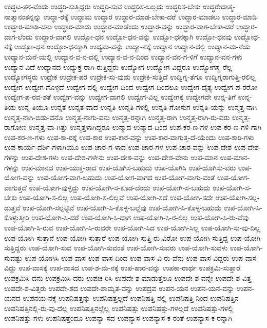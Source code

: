{ಉದ್ಧಟ-ತನ-ವೆಂದು
ಉದ್ಧರಿ-ಸುತ್ತಿದ್ದರು
ಉದ್ಧರಿ-ಸುವ
ಉದ್ಧರಿಸ-ಬಲ್ಲದು
ಉದ್ಧರಿಸ-ಬೇಕು
ಉದ್ಧರೇದಾತ್ಮ-ನಾತ್ಮಾನಂತನ್ನನ್ನು
ಉದ್ಧಾ-ರಕ್ಕೆ
ಉದ್ಧಾಮ
ಉದ್ಧಾರ
ಉದ್ಧಾರ-ಮಾಡ-ಬೇಕಾ-ದರೆ
ಉದ್ಧಾರ-ಮಾಡಲು
ಉದ್ಧಾರ-ಮಾಡಿ
ಉದ್ಧಾರ-ಮಾಡಿ-ದನು
ಉದ್ಧಾರ-ಮಾಡು
ಉದ್ಧಾರ-ಮಾಡೆಂದು
ಉದ್ಧಾರ-ವನ್ನು
ಉದ್ಧಾರ-ವಾಗ-ಬೇಕಾ-ದರೆ
ಉದ್ಧಾರ-ವಾಗ-ಲೆಂದು
ಉದ್ಧಾರ-ವಾಗಲಿ
ಉದ್ಬೋ-ಧನ
ಉದ್ಬೋ-ಧನ-ವನ್ನು
ಉದ್ಬೋ-ಧನಕ್ಕಾಗಿ
ಉದ್ಬೋ-ಧನವು
ಉದ್ಬೋಧ-ನಕ್ಕೆ
ಉದ್ಭೋ-ಧನ
ಉದ್ಭೋ-ಧನಕ್ಕಾಗಿ
ಉದ್ಯಮ-ವನ್ನು
ಉದ್ಯಾ-ನಕ್ಕೆ
ಉದ್ಯಾನ
ಉದ್ಯಾನ-ದಲ್ಲಿ
ಉದ್ಯಾನ-ಮ-ನೆಯ
ಉದ್ಯಾನ-ಮನೆ-ಯಲ್ಲಿ
ಉದ್ಯಾನ-ವ-ನ-ದಲ್ಲಿ
ಉದ್ಯಾನ-ವ-ನ-ದಿಂದ
ಉದ್ಯಾನ-ವನ-ಗ-ಳಿಗೆ
ಉದ್ಯಾನ-ವನ-ಗಳು
ಉದ್ಯಾನ-ವಿದೆ
ಉದ್ಯಾನದ
ಉದ್ಯುಕ್ತ-ರಾಗಿ-ರುತ್ತಿದ್ದರು
ಉದ್ಯೋಗ
ಉದ್ಯೋಗ-ವಿದ್ದರೂ
ಉದ್ಯೋಗಸ್ಥ-ರೆಲ್ಲ
ಉದ್ಯೋಗಸ್ಥರು
ಉದ್ರೇಕ
ಉದ್ರೇಕ-ಪರ
ಉದ್ರೇಕಿ-ಸು-ವುದು
ಉದ್ರೇಕಿ-ಸುತ್ತಿದೆ
ಉದ್ವಿಗ್ನ-ತೆಗೂ
ಉದ್ವಿಗ್ನರಾಗುತ್ತಿ-ರಲಿಲ್ಲ
ಉದ್ವೇಗ
ಉದ್ವೇಗ-ಗೊಳ್ಳದೆ
ಉದ್ವೇಗ-ದಲ್ಲಿ
ಉದ್ವೇಗ-ದಿಂದ
ಉದ್ವೇಗ-ದಿಂದಲೂ
ಉದ್ವೇಗ-ದೈತ್ಯ
ಉದ್ವೇಗ-ಪ-ರರೋ
ಉದ್ವೇಗ-ಪ-ರವ-ಶತೆ
ಉದ್ವೇಗ-ವನ್ನು
ಉದ್ವೇಗ-ವಾಗಲಿ
ಉದ್ವೇಗ-ವಿಲ್ಲ
ಉದ್ವೇಗಕ್ಕೆ
ಉದ್ವೇಗವೇ
ಉನ್ನ-ತಿಗೆ
ಉನ್ನ-ತಿಯ
ಉನ್ನ-ತಿಯೂ
ಉನ್ನತ
ಉನ್ನತ-ವಾದ
ಉನ್ನತಿ
ಉನ್ನತಿ-ಗಳಲ್ಲಿ
ಉನ್ನತಿ-ಗೋಸುಗ
ಉನ್ನತಿ-ಯನ್ನು
ಉನ್ಮತ್ತ-ನಾಗಿ
ಉನ್ಮತ್ತ-ನಾಗಿ-ಬಿಡು-ವನೊ
ಉನ್ಮತ್ತ-ನಾಗು-ವನು
ಉನ್ಮತ್ತ-ರನ್ನಾಗಿ
ಉನ್ಮತ್ತ-ರಾಗಿ
ಉನ್ಮತ್ತ-ರಾಗಿ-ರು-ವರು
ಉನ್ಮತ್ತ-ರಾಗೋಣ
ಉನ್ಮತ್ತ-ವಾ-ಗಿತ್ತು
ಉನ್ಮತ್ತಳಾಗಿದ್ದರೂ
ಉನ್ಮಾದ
ಉನ್ಮಾದ-ದಿಂದ
ಉಪ-ಕರ-ಣ-ಗಳ
ಉಪ-ಕರ-ಣ-ಗಳಿ-ಗಾಗಿ
ಉಪ-ಕರ-ಣ-ಗಳು
ಉಪ-ಕಾ-ರಕ್ಕೆ
ಉಪ-ಕಾರ
ಉಪ-ಕಾರ-ವನ್ನು
ಉಪ-ಕಾರ-ವಾಗುತ್ತ-ದೆ-ಯೆಂದು
ಉಪ-ಕಾರಿ-ಗಳು
ಉಪ-ಕಾರ್ಯ-ದರ್ಶಿ-ಗಳಾಗಿಯೂ
ಉಪ-ಚಾರ-ಗ-ಳಾದ
ಉಪ-ಚಾರ-ಗಳ
ಉಪ-ಚಾರ-ವನ್ನು
ಉಪ-ದೇಶ
ಉಪ-ದೇಶ-ಗಳನ್ನು
ಉಪ-ದೇಶ-ಗಳು
ಉಪ-ದೇಶ-ಗಳೇನು
ಉಪ-ದೇಶ-ವನ್ನು
ಉಪ-ದೇಶ-ವೇನು
ಉಪ-ಮಾನ
ಉಪ-ಮಾನ-ಗಳನ್ನು
ಉಪ-ಮಾನದ
ಉಪ-ಯುಕ್ತ-ರಾದ
ಉಪ-ಯೊಗಿಸ-ಬಹುದು
ಉಪ-ಯೊಗಿಸಿ
ಉಪ-ಯೊಗಿಸು-ವರು
ಉಪ-ಯೋಗ-ವನ್ನು
ಉಪ-ಯೋಗ-ವಾಗ-ಬಹುದು
ಉಪ-ಯೋಗ-ವಾಗದ
ಉಪ-ಯೋಗ-ವಾಗು-ವಂತೆ
ಉಪ-ಯೋಗ-ವಾಗುತ್ತದೆ
ಉಪ-ಯೋಗ-ವುಳ್ಳದ್ದು
ಉಪ-ಯೋಗಿ-ಸ-ಕೂಡ-ದೆಂದು
ಉಪ-ಯೋಗಿ-ಸ-ಬಹುದು
ಉಪ-ಯೋಗಿ-ಸ-ಬೇಕು
ಉಪ-ಯೋಗಿ-ಸ-ಲಿಲ್ಲ
ಉಪ-ಯೋಗಿ-ಸ-ಲಿಲ್ಲವೆ
ಉಪ-ಯೋಗಿ-ಸದೆ
ಉಪ-ಯೋಗಿ-ಸದೇ
ಉಪ-ಯೋಗಿ-ಸಲ್ಪ-ಡುತ್ತವೆ
ಉಪ-ಯೋಗಿ-ಸಲ್ಪಟ್ಟಿವೆ
ಉಪ-ಯೋಗಿ-ಸಿ-ಕೊಳ್ಳ-ಬಲ್ಲೆವು
ಉಪ-ಯೋಗಿ-ಸಿ-ಕೊಳ್ಳ-ಬಹುದು
ಉಪ-ಯೋಗಿ-ಸಿ-ಕೊಳ್ಳುತ್ತೀರಿ
ಉಪ-ಯೋಗಿ-ಸಿ-ದರೆ
ಉಪ-ಯೋಗಿ-ಸಿ-ದಾಗ
ಉಪ-ಯೋಗಿ-ಸಿ-ರ-ಲಿಲ್ಲ
ಉಪ-ಯೋಗಿ-ಸಿ-ರು-ವೆವು
ಉಪ-ಯೋಗಿ-ಸಿ-ರುವ
ಉಪ-ಯೋಗಿ-ಸಿ-ರುವರೇ
ಉಪ-ಯೋಗಿ-ಸಿದ
ಉಪ-ಯೋಗಿ-ಸಿಲ್ಲ
ಉಪ-ಯೋಗಿ-ಸು-ವು-ದಿಲ್ಲ
ಉಪ-ಯೋಗಿ-ಸುತ್ತಾನೆ
ಉಪ-ಯೋಗಿ-ಸುತ್ತಾರೆ
ಉಪ-ಯೋಗಿ-ಸುತ್ತಿ-ರು-ವಿರೋ
ಉಪ-ಯೋಗಿ-ಸುತ್ತಿದ್ದ
ಉಪ-ಯೋಗಿ-ಸುತ್ತಿದ್ದರು
ಉಪ-ಯೋಗಿ-ಸುವ
ಉಪ-ಯೋಗಿ-ಸುವಂತೆ
ಉಪ-ಯೋಗಿ-ಸುವರು
ಉಪ-ಯೋಗಿ-ಸುವಳು
ಉಪ-ಯೋಗಿ-ಸುವಷ್ಟು
ಉಪ-ಯೋಗಿಸಿ
ಉಪ-ವಾಸ
ಉಪ-ವಾಸ-ದಿಂದ
ಉಪ-ವಾಸ-ವಿ-ರು-ವೆನು
ಉಪ-ವಾಸ-ವಿದ್ದರು
ಉಪ-ವಾಸ-ವಿದ್ದು
ಉಪ-ವಾಸಕ್ಕೆ
ಉಪ-ವಾಸದ
ಉಪ-ಶ-ಮ-ನಕ್ಕೆ
ಉಪ-ಹಾರ-ವನ್ನು
ಉಪಕಾ-ರಾರ್ಥ
ಉಪಕ್ರಮಿ-ಸುತ್ತಾರೆ
ಉಪಕ್ರಮಿಸಿ-ದನು
ಉಪಕ್ರಮಿಸಿ-ದರು
ಉಪಚ-ರಿಸಿ
ಉಪದೇ-ಶ-ಮಾಡುತ್ತಲೂ
ಉಪದೇ-ಶ-ವನ್ನೇ
ಉಪದೇ-ಶ-ವಿತ್ತ
ಉಪದೇ-ಶ-ವಿತ್ತರು
ಉಪದೇ-ಶದ
ಉಪದೇ-ಶಾಮೃತ-ವನ್ನು
ಉಪದ್ರವ
ಉಪನ-ಯನ
ಉಪನ-ಯನ-ವನ್ನು
ಉಪನ-ಯನದ
ಉಪನಯ-ನಕ್ಕೆ
ಉಪನಿಷತ್ತನ್ನು
ಉಪನಿಷತ್ತಲ್ಲದೆ
ಉಪನಿಷತ್ತಿ-ನಲ್ಲಿ
ಉಪನಿಷತ್ತಿ-ನಿಂದ
ಉಪನಿಷತ್ತಿನ
ಉಪನಿಷತ್ತಿನಲ್ಲಿ-ರು-ವು-ದೆಲ್ಲ
ಉಪನಿಷತ್ತಿನಲ್ಲೆಲ್ಲ
ಉಪನಿಷತ್ತು
ಉಪನಿಷತ್ತು-ಗಳಲ್ಲದೆ
ಉಪನಿಷತ್ತು-ಗಳಲ್ಲಿ
ಉಪನಿಷತ್ತು-ಗಳು
ಉಪನಿಷತ್ತೆಂದೂ
ಉಪನ್ಯಾ-ಸದ
ಉಪನ್ಯಾಸ
ಉಪನ್ಯಾಸ-ಕ-ರಂತೆ
ಉಪನ್ಯಾಸ-ಕ-ರನ್ನಾಗಿ
}
